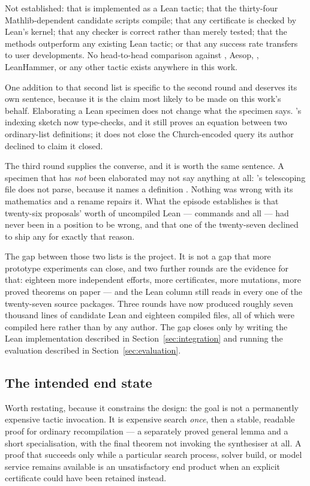 Not established: that \forge{} is implemented as a Lean tactic; that the
thirty-four Mathlib-dependent candidate scripts compile; that any certificate
is checked by Lean's kernel; that any checker is correct rather than merely
tested; that the methods outperform any existing Lean tactic; or that any
success rate transfers to user developments. No head-to-head comparison against
\grind{}, Aesop, , LeanHammer, or any other tactic exists
anywhere in this work.

One addition to that second list is specific to the second round and deserves
its own sentence, because it is the claim most likely to be made on this work's
behalf. Elaborating a Lean specimen does not change what the specimen says.
's indexing sketch now type-checks, and it still proves an equation
between two ordinary-list definitions; it does not close the Church-encoded
query its author declined to claim it closed.

The third round supplies the converse, and it is worth the same sentence. A
specimen that has \emph{not} been elaborated may not say anything at all:
's telescoping file does not parse, because it names a definition
. Nothing was wrong with its mathematics and a rename repairs it.
What the episode establishes is that twenty-six proposals' worth of uncompiled
Lean ---  commands and all --- had never been in a
position to be wrong, and that one of the twenty-seven declined to ship any for
exactly that reason.

The gap between those two lists is the project. It is not a gap that more
prototype experiments can close, and two further rounds are the evidence for
that: eighteen more independent efforts, more certificates, more mutations,
more proved theorems on paper --- and the Lean column still reads
 in every one of the twenty-seven source packages. Three rounds
have now produced roughly seven thousand lines of candidate Lean and eighteen
compiled files, all of which were compiled here rather than by any author. The
gap closes only by writing the Lean implementation described in
Section~\ref{sec:integration} and running the evaluation described in
Section~\ref{sec:evaluation}.

\subsection{The intended end state}

Worth restating, because it constrains the design: the goal is not a permanently
expensive tactic invocation. It is expensive search \emph{once}, then a stable,
readable proof for ordinary recompilation --- a separately proved general lemma
and a short specialisation, with the final theorem not invoking the synthesiser
at all. A proof that succeeds only while a particular search process, solver
build, or model service remains available is an unsatisfactory end product when
an explicit certificate could have been retained instead.

